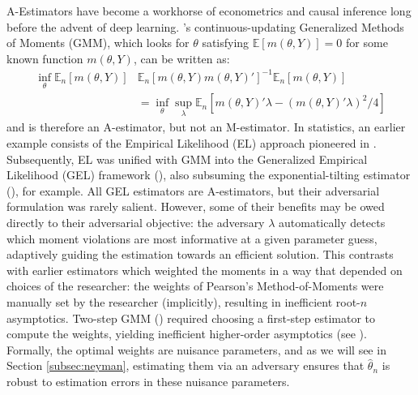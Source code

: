 \documentclass[12pt]{article}
\theoremstyle{myplain}
\theoremstyle{definition}
\theoremstyle{definition}
\theoremstyle{remark}
\numberwithin{equation}{section}
\begin{document}
A-Estimators have become a workhorse of econometrics and causal inference long before the advent of deep learning. \cite{CUEGMM}'s continuous-updating Generalized Methods of Moments (GMM), which looks for $\theta$ satisfying $\mathbb{E}[m(\theta,Y)]=0$ for some known function $m(\theta, Y)$, can be written as:
\begin{align*}
\inf_\theta  \mathbb{E}_n\left[m(\theta,Y)\right] &\mathbb{E}_n\left[m(\theta,Y)m(\theta,Y)'\right]^{-1}\mathbb{E}_n\left[m(\theta,Y)\right] \\ &=\inf_\theta\sup_\lambda\mathbb{E}_n\left[m(\theta,Y)'\lambda - (m(\theta,Y)'\lambda)^2/4\right]
\end{align*}
and is therefore an A-estimator, but not an M-estimator. In statistics, an earlier example consists of the Empirical Likelihood (EL) approach pioneered in \cite{cosslet1981, owen1988empirical, owen1990empirical, qin1994empirical}. Subsequently, EL was unified with GMM into the Generalized Empirical Likelihood (GEL) framework (\cite{newey2004generalized}), also subsuming the exponential-tilting estimator (\cite{imbens1995gel}), for example. All GEL estimators are A-estimators, but their adversarial formulation was rarely salient. However, some of their benefits may be owed directly to their adversarial objective: the adversary $\lambda$ automatically detects which moment violations are most informative at a given parameter guess, adaptively guiding the estimation towards an efficient solution. This contrasts with earlier estimators which weighted the moments in a way that depended on choices of the researcher: the weights of Pearson's Method-of-Moments were manually set by the researcher (implicitly), resulting in inefficient root-$n$ asymptotics. Two-step GMM (\cite{hansen1982gmm}) required choosing a first-step estimator to compute the weights, yielding inefficient higher-order asymptotics (see \cite{newey2004generalized}). Formally, the optimal weights are nuisance parameters, and as we will see in Section \ref{subsec:neyman}, estimating them via an adversary ensures that $\widehat{\theta}_n$ is robust to estimation errors in these nuisance parameters.\\
\end{document}
